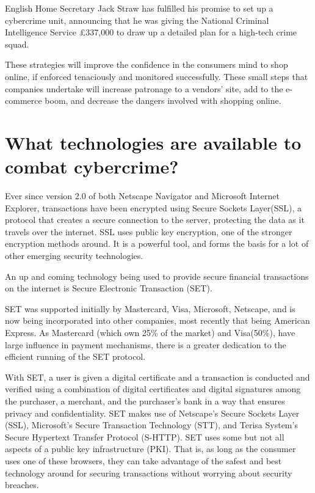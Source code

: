 \documentclass[11pt,a4paper,twoside,notitlepage]{article}
\begin{document}
English Home Secretary Jack Straw has fulfilled his promise to set up a
cybercrime unit, announcing that he was giving the National Criminal
Intelligence Service \pounds 337,000 to draw up a detailed plan for a
high-tech crime squad\cite{August:Comp00}.

These strategies will improve the confidence in the consumers mind to shop online, if enforced tenaciously and monitored successfully.  These small steps that companies undertake will increase patronage to a vendors' site, add to the e-commerce boom, and decrease the dangers involved with shopping online. 




\section*{What technologies are available to combat cybercrime?}


Ever since version 2.0 of both Netscape Navigator and Microsoft Internet Explorer, transactions have been 
encrypted using Secure Sockets Layer(SSL), a protocol that creates a secure connection to the server, protecting
the data as it travels over the internet.  SSL uses public key encryption, one of the stronger encryption methods
around.  It is a powerful tool, and forms the basis for a lot of other emerging security technologies. 


An up and coming technology being used to provide secure financial transactions on
the internet is Secure Electronic Transaction (SET). 

 
SET was supported initially by Mastercard, Visa, Microsoft, Netscape, and is now being incorporated into
other companies, most recently that being American Express.
As Mastercard (which own 25\% of the market) and Visa(50\%), have large influence in payment mechanisms,
there is a greater dedication to the efficient running of the SET protocol\cite{Clarke:url99}.


With SET, a user is given a digital certificate and a transaction is
conducted and verified using a combination of digital certificates and digital signatures among the purchaser, a merchant, and the purchaser's
bank in a way that ensures privacy and confidentiality. SET makes use of Netscape's Secure Sockets Layer (SSL), Microsoft's Secure
Transaction Technology (STT), and Terisa System's Secure Hypertext Transfer Protocol (S-HTTP).  SET uses some but not all aspects of a
public key infrastructure (PKI).  That is, as long as the
consumer uses one of these browsers, they can take advantage of the safest and
best technology around for securing transactions without worrying about security
breaches.
 
\end{document}
